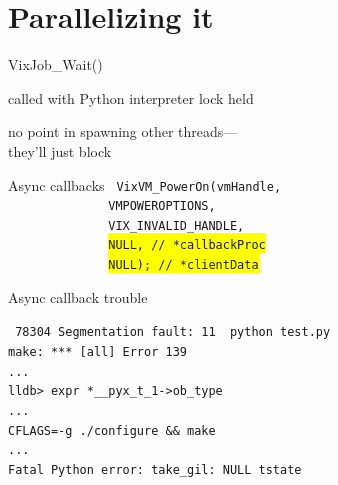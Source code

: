 \documentclass[xcolor=svgnames,17pt]{beamer}
\newcommand*{\sizefont}[1]{%
    \ifcase#1\relax
    \or \tiny
    \or \scriptsize
    \or \footnotesize
    \or \small
    \or \normalsize
    \or \large
    \or \Large
    \or \LARGE
    \or \huge
    \or \Huge
    \fi}
\begin{document}
\section{Parallelizing it}

\begin{frame}{}
\tableofcontents[currentsection]
\end{frame}

\begin{frame}{VixJob\_Wait()}

called with Python interpreter lock held

\vspace\baselineskip

no point in spawning other threads—\\
they’ll just block

\end{frame}

\setlength\fboxsep{1pt}
\def\h#1{\colorbox{yellow}{#1}}

\small
\begin{frame}{Async callbacks}
\texttt{%
VixVM\_PowerOn(vmHandle, \\
\ \ \ \ \ \ \ \ \ \ \ \ \ \ VMPOWEROPTIONS, \\
\ \ \ \ \ \ \ \ \ \ \ \ \ \ VIX\_INVALID\_HANDLE, \\
\ \ \ \ \ \ \ \ \ \ \ \ \ \ \h{NULL, // *callbackProc} \\
\ \ \ \ \ \ \ \ \ \ \ \ \ \ \h{NULL); // *clientData}
}

\vspace\baselineskip

\href{https://github.com/cython/cython/tree/master/Demos/callback/cheese.pyx}{%
    }

\end{frame}

\begin{frame}{Async callback trouble}

\sizefont{3}
\texttt{%
78304 Segmentation fault: 11\ \ python test.py \\
make: *** [all] Error 139 \\
... \\
\pause
lldb> expr *\_\_pyx\_t\_1->ob\_type \\
... \\
\pause
CFLAGS=-g ./configure \&\& make \\
... \\
\pause
Fatal Python error: take\_gil: NULL tstate
}

\end{frame}
\end{document}
